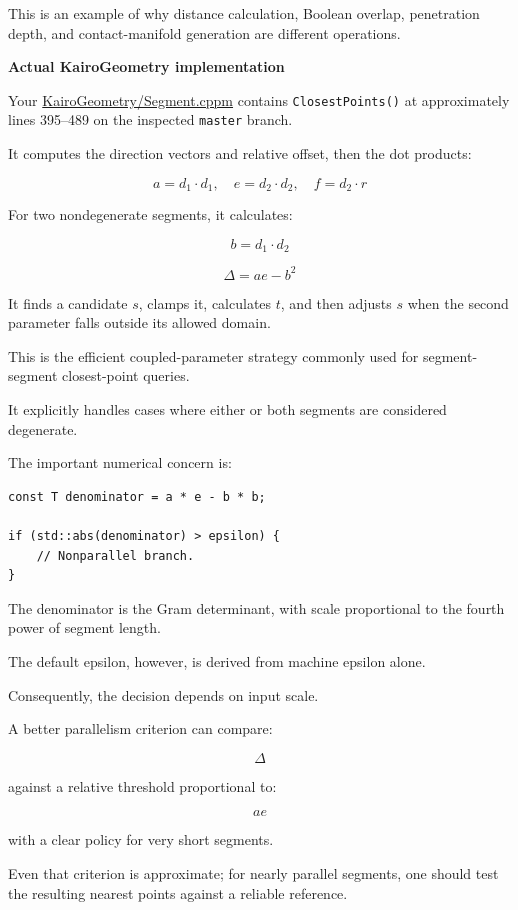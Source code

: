 This is an example of why distance calculation, Boolean overlap, penetration depth, and contact-manifold generation are different operations.

\textbf{Actual KairoGeometry implementation}

Your \href{https://github.com/swayam8624/KairoGeometry/blob/master/Segment.cppm?utm_source=chatgpt.com}{KairoGeometry/Segment.cppm} contains \texttt{ClosestPoints()} at approximately lines 395--489 on the inspected \texttt{master} branch.

It computes the direction vectors and relative offset, then the dot products:

\[
a=d_1\cdot d_1,\quad e=d_2\cdot d_2,\quad f=d_2\cdot r
\]

For two nondegenerate segments, it calculates:

\[
b=d_1\cdot d_2
\]

\[
\Delta=ae-b^2
\]

It finds a candidate \(s\), clamps it, calculates \(t\), and then adjusts \(s\) when the second parameter falls outside its allowed domain.

This is the efficient coupled-parameter strategy commonly used for segment-segment closest-point queries.

It explicitly handles cases where either or both segments are considered degenerate.

The important numerical concern is:

\begin{verbatim}
const T denominator = a * e - b * b;

if (std::abs(denominator) > epsilon) {
    // Nonparallel branch.
}
\end{verbatim}

The denominator is the Gram determinant, with scale proportional to the fourth power of segment length.

The default epsilon, however, is derived from machine epsilon alone.

Consequently, the decision depends on input scale.

A better parallelism criterion can compare:

\[
\Delta
\]

against a relative threshold proportional to:

\[
ae
\]

with a clear policy for very short segments.

Even that criterion is approximate; for nearly parallel segments, one should test the resulting nearest points against a reliable reference.

